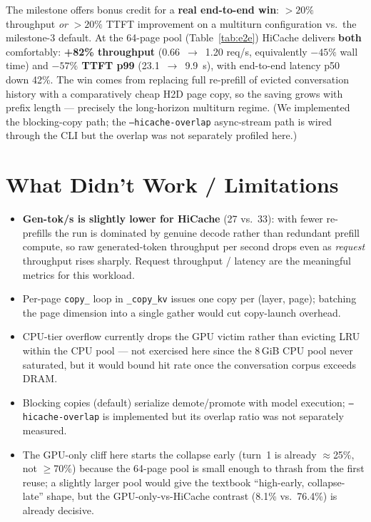 \documentclass[11pt]{article}
\begin{document}
The milestone offers bonus credit for a \textbf{real end-to-end win}: $>20\%$ throughput \emph{or} $>20\%$ TTFT improvement on a multiturn configuration vs.\ the milestone-3 default. At the 64-page pool (Table~\ref{tab:e2e}) HiCache delivers \textbf{both} comfortably: \textbf{+82\% throughput} (0.66~$\to$~1.20 req/s, equivalently $-45\%$ wall time) and \textbf{$-57\%$ TTFT p99} (23.1~$\to$~9.9~s), with end-to-end latency p50 down 42\%. The win comes from replacing full re-prefill of evicted conversation history with a comparatively cheap H2D page copy, so the saving grows with prefix length --- precisely the long-horizon multiturn regime. (We implemented the blocking-copy path; the \texttt{--hicache-overlap} async-stream path is wired through the CLI but the overlap was not separately profiled here.)

\section{What Didn't Work / Limitations}

\begin{itemize}
  \item \textbf{Gen-tok/s is slightly lower for HiCache} (27 vs.\ 33): with fewer re-prefills the run is dominated by genuine decode rather than redundant prefill compute, so raw generated-token throughput per second drops even as \emph{request} throughput rises sharply. Request throughput / latency are the meaningful metrics for this workload.
  \item Per-page \texttt{copy\_} loop in \texttt{\_copy\_kv} issues one copy per (layer, page); batching the page dimension into a single gather would cut copy-launch overhead.
  \item CPU-tier overflow currently drops the GPU victim rather than evicting LRU within the CPU pool --- not exercised here since the 8\,GiB CPU pool never saturated, but it would bound hit rate once the conversation corpus exceeds DRAM.
  \item Blocking copies (default) serialize demote/promote with model execution; \texttt{--hicache-overlap} is implemented but its overlap ratio was not separately measured.
  \item The GPU-only cliff here starts the collapse early (turn~1 is already $\approx$25\%, not $\ge$70\%) because the 64-page pool is small enough to thrash from the first reuse; a slightly larger pool would give the textbook ``high-early, collapse-late'' shape, but the GPU-only-vs-HiCache contrast (8.1\% vs.\ 76.4\%) is already decisive.
\end{itemize}
\end{document}
